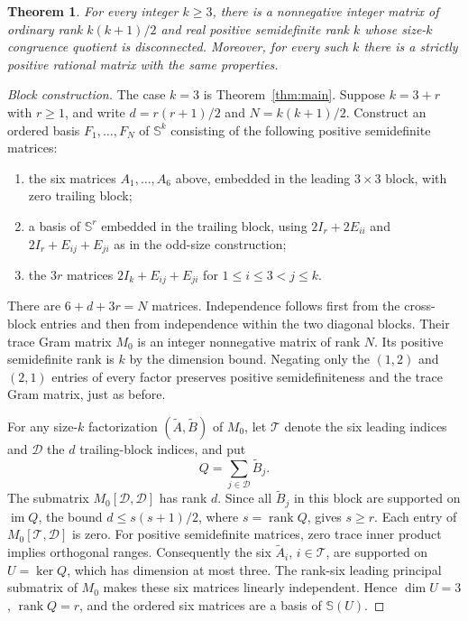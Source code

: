 \documentclass[11pt]{article}
\newtheorem{theorem}{Theorem}
\newcommand{\rank}{\operatorname{rank}}
\begin{document}
\begin{theorem}\label{thm:all-sizes}
For every integer $k\geq3$, there is a nonnegative integer matrix of ordinary rank $k(k+1)/2$ and real positive semidefinite rank $k$ whose size-$k$ congruence quotient is disconnected. Moreover, for every such $k$ there is a strictly positive rational matrix with the same properties.
\end{theorem}
\begin{proof}[Block construction]
The case $k=3$ is Theorem~\ref{thm:main}. Suppose $k=3+r$ with $r\geq1$, and write $d=r(r+1)/2$ and $N=k(k+1)/2$. Construct an ordered basis $F_1,\ldots,F_N$ of $\mathbb S^k$ consisting of the following positive semidefinite matrices:
\begin{enumerate}
\item the six matrices $A_1,\ldots,A_6$ above, embedded in the leading $3\times3$ block, with zero trailing block;
\item a basis of $\mathbb S^r$ embedded in the trailing block, using $2I_r+2E_{ii}$ and $2I_r+E_{ij}+E_{ji}$ as in the odd-size construction;
\item the $3r$ matrices $2I_k+E_{ij}+E_{ji}$ for $1\leq i\leq3<j\leq k$.
\end{enumerate}
There are $6+d+3r=N$ matrices. Independence follows first from the cross-block entries and then from independence within the two diagonal blocks. Their trace Gram matrix $M_0$ is an integer nonnegative matrix of rank $N$. Its positive semidefinite rank is $k$ by the dimension bound. Negating only the $(1,2)$ and $(2,1)$ entries of every factor preserves positive semidefiniteness and the trace Gram matrix, just as before.

For any size-$k$ factorization $(\widetilde A,\widetilde B)$ of $M_0$, let $\mathcal T$ denote the six leading indices and $\mathcal D$ the $d$ trailing-block indices, and put
\[
 Q=\sum_{j\in\mathcal D}\widetilde B_j.
\]
The submatrix $M_0[\mathcal D,\mathcal D]$ has rank $d$. Since all $\widetilde B_j$ in this block are supported on $\operatorname{im}Q$, the bound $d\leq s(s+1)/2$, where $s=\rank Q$, gives $s\geq r$. Each entry of $M_0[\mathcal T,\mathcal D]$ is zero. For positive semidefinite matrices, zero trace inner product implies orthogonal ranges. Consequently the six $\widetilde A_i$, $i\in\mathcal T$, are supported on $U=\ker Q$, which has dimension at most three. The rank-six leading principal submatrix of $M_0$ makes these six matrices linearly independent. Hence $\dim U=3$, $\rank Q=r$, and the ordered six matrices are a basis of $\mathbb S(U)$.


\end{proof}
\end{document}
